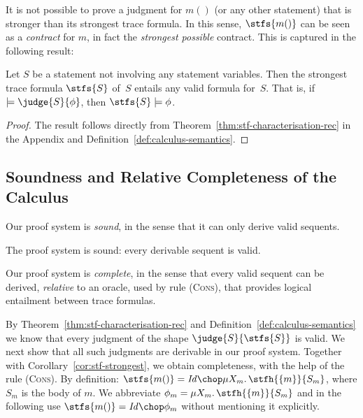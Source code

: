 \documentclass[a4paper,numberwithinsect]{lipics-v2021}
\begin{document}
It is not possible to prove a judgment for $m()$ (or any other
statement) that is stronger than its strongest trace formula. In this
sense, $\stfs{m()}$ can be seen as a \emph{contract} for $m$, in fact
the \emph{strongest possible} contract. This is captured in the
following result:

\begin{corollary}
  \label{cor:stf-strongest}
  Let $S$ be a statement not involving any statement variables. Then
  the strongest trace formula $\stfs{S}$ of~$S$ entails any valid
  formula for~$S$.
  That is, if $\models \judge{S}{\phi}$, then $\stfs{S} \models \phi$.
\end{corollary}

\begin{proof}
  The result follows directly from
  Theorem~\ref{thm:stf-characterisation-rec} in the Appendix and
  Definition~\ref{def:calculus-semantics}.  %
\end{proof}


\subsection{Soundness and Relative Completeness of the Calculus} 

Our proof system is \emph{sound}, in the sense that it can only
derive valid sequents.
%

\begin{theorem}[Soundness]
  \label{thm:calculus-soundness}
  The proof system is sound: every derivable sequent is valid.
\end{theorem}



Our proof system is \emph{complete}, in the sense that every valid
sequent can be derived, \emph{relative} to an oracle, used by rule
(\textsc{Cons}), that provides logical entailment between trace
formulas.

By Theorem~\ref{thm:stf-characterisation-rec} and 
Definition~\ref{def:calculus-semantics} we know that every judgment
of the shape $\judge{S}{\stfs{S}}$ is valid. 
%
We next show that all such judgments are derivable in our proof system.
%
Together with Corollary~\ref{cor:stf-strongest}, we obtain completeness,
with the help of the rule (\textsc{Cons}).
%
By definition:
$
  \stfs{m()}=\mathit{Id}\chop\mu X_m.\,\stfh{\{m\}}{S_m} %
$,
%
where $S_m$ is the body of $m$. We abbreviate
$\phi_m=\mu X_m.\,\stfh{\{m\}}{S_m}$ and in the following use
$\stfs{m()}=\mathit{Id}\chop\phi_m$ without mentioning it explicitly.
\end{document}
